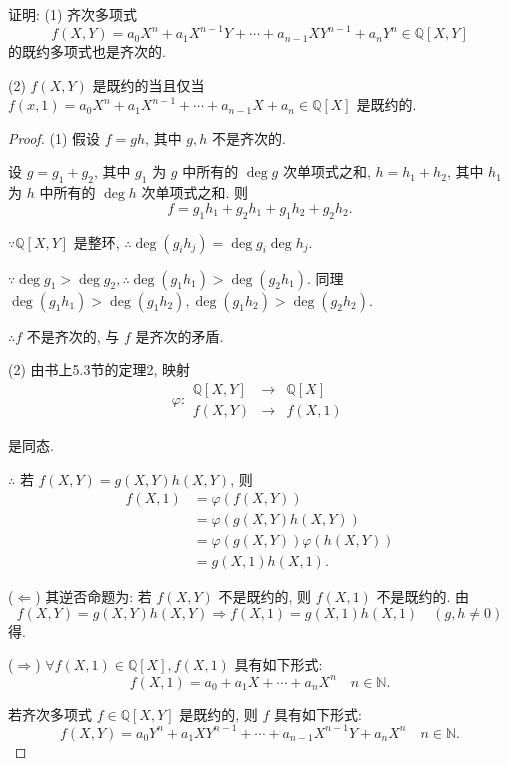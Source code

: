 \documentclass[color=black,device=normal,lang=cn,mode=geye]{elegantnote}
\begin{document}
\begin{exercise}%
    证明: (1) 齐次多项式
    \[f(X,Y)=a_0X^n+a_1X^{n-1}Y+\cdots+a_{n-1}XY^{n-1}+a_nY^n\in\mathbb{Q}[X,Y]\]
    的既约多项式也是齐次的.
    
    (2) $f(X,Y)$ 是既约的当且仅当 $f(x,1)=a_0X^n+a_1X^{n-1}+\cdots+a_{n-1}X+a_n\in\mathbb{Q}[X]$ 是既约的.
\end{exercise}
\begin{proof}
    (1) 假设 $f=gh$, 其中 $g,h$ 不是齐次的.

    设 $g=g_1+g_2$, 其中 $g_1$ 为 $g$ 中所有的 $\deg g$ 次单项式之和, $h=h_1+h_2$, 其中 $h_1$ 为 $h$ 中所有的 $\deg h$ 次单项式之和. 则
    \[f=g_1h_1+g_2h_1+g_1h_2+g_2h_2.\]

    $\because\mathbb{Q}[X,Y]$ 是整环, $\therefore\deg(g_ih_j)=\deg g_i\deg h_j$.
    
    $\because\deg g_1>\deg g_2,\therefore\deg(g_1h_1)>\deg(g_2h_1)$. 同理 $\deg(g_1h_1)>\deg(g_1h_2),\deg(g_1h_2)>\deg(g_2h_2)$.

    $\therefore f$ 不是齐次的, 与 $f$ 是齐次的矛盾.

    (2) 由书上5.3节的定理2, 映射
    \[\varphi:\begin{array}{rcl}
        \mathbb{Q}[X,Y] & \to & \mathbb{Q}[X] \\
        f(X,Y) & \to & f(X,1)
    \end{array}\]

    是同态.

    $\therefore$ 若 $f(X,Y)=g(X,Y)h(X,Y)$, 则
    \begin{align*}
        f(X,1) & =\varphi(f(X,Y)) \\
        & =\varphi(g(X,Y)h(X,Y)) \\
        & =\varphi(g(X,Y))\varphi(h(X,Y)) \\
        & =g(X,1)h(X,1).
    \end{align*}

    ($\Leftarrow$) 其逆否命题为: 若 $f(X,Y)$ 不是既约的, 则 $f(X,1)$ 不是既约的. 由
    \[f(X,Y)=g(X,Y)h(X,Y)\Rightarrow f(X,1)=g(X,1)h(X,1)\quad(g,h\neq0)\]
    得.
    
    ($\Rightarrow$) $\forall f(X,1)\in\mathbb{Q}[X],f(X,1)$ 具有如下形式:
    \begin{equation}\label{eq4.4}
        f(X,1)=a_0+a_1X+\cdots+a_nX^n\quad n\in\mathbb{N}.
    \end{equation}

    若齐次多项式 $f\in\mathbb{Q}[X,Y]$ 是既约的, 则 $f$ 具有如下形式:
    \begin{equation}\label{eq4.5}
        f(X,Y)=a_0Y^n+a_1XY^{n-1}+\cdots+a_{n-1}X^{n-1}Y+a_nX^n\quad n\in\mathbb{N}.
    \end{equation}


\end{proof}
\end{document}
